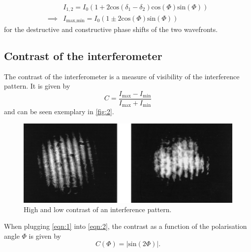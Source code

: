 \begin{equation}
    \label{eqn:1}
    \begin{aligned}
        &I_{1,2} = I_0 \left( 1 + 2\text{cos}\left( \delta_1 - \delta_2 \right) \text{cos}\left(\Phi\right) \text{sin}\left(\Phi\right)\right) \\
        \implies &I_{\text{max,min}} = I_0 \left( 1 \pm 2\text{cos}\left(\Phi\right) \text{sin}\left(\Phi\right)\right)
    \end{aligned}
\end{equation}
for the destructive and constructive phase shifts of the two wavefronts.
\newpage
\subsection{Contrast of the interferometer}
The contrast of the interferometer is a measure of visibility of the interference pattern. It is given by 
\begin{equation}
    \label{eqn:2}
    C = \frac{I_\text{max} - I_\text{min}}{I_\text{max} + I_\text{min}}
\end{equation}
and can be seen exemplary in \autoref{fig:2}.
\begin{figure}[H]
    \centering
    \includegraphics[width=.8\linewidth]{high_low_cont.pdf}
    \caption{High and low contrast of an interference pattern. \cite{article1}}
    \label{fig:2}
\end{figure}
When plugging \autoref{eqn:1} into \autoref{eqn:2}, the contrast as a function of the polarisation angle $\Phi$ is given by 
\begin{equation}
    \label{eqn:contrast}
    C\left(\Phi\right) = |\text{sin}\left(2\Phi\right)|.
\end{equation}


